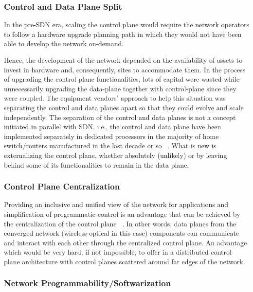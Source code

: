 \subsubsection{Control and Data Plane Split}

In the pre-\ac{SDN} era, scaling the control plane would require the network operators to follow a hardware upgrade planning path in which they would not have been able to develop the network on-demand. 

Hence, the development of the network depended on the availability of assets to invest in hardware and, consequently, sites to accommodate them. In the process of upgrading the control plane functionalities, lots of capital were wasted while unnecessarily upgrading the data-plane together with control-plane since they were coupled. The equipment vendors' approach to help this situation was separating the control and data planes apart so that they could evolve and scale independently. The separation of the control and data planes is not a concept initiated in parallel with SDN. i.e., the control and data plane have been implemented separately in dedicated processors in the majority of home switch/routers manufactured in the last decade or so ~\cite{D.:2013:SSD:2566940}. What is new is externalizing the control plane, whether absolutely (unlikely) or by leaving behind some of its functionalities to remain in the data plane.

\subsubsection{Control Plane Centralization}

Providing an inclusive and unified view of the network for applications and simplification of programmatic control is an advantage that can be achieved by the centralization of the control plane ~\cite{D.:2013:SSD:2566940}. In other words, data planes from the converged network (wireless-optical in this case) components can communicate and interact with each other through the centralized control plane. An advantage which would be very hard, if not impossible, to offer in a distributed control plane architecture with control planes scattered around far edges of the network.

\subsubsection{Network Programmability/Softwarization}

